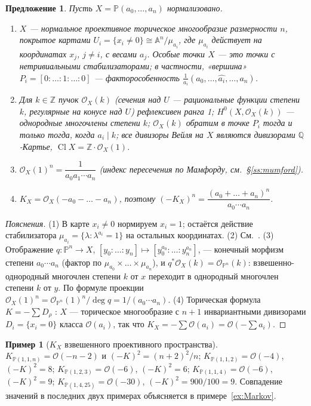 \documentclass[11pt,a4paper]{article}
\theoremstyle{plain}
\newtheorem{proposition}[theorem]{Предложение}
\theoremstyle{definition}
\newtheorem{example}[theorem]{Пример}
\theoremstyle{remark}
\newcommand{\Z}{\mathbb{Z}}
\newcommand{\Q}{\mathbb{Q}}
\newcommand{\PP}{\mathbb{P}}
\newcommand{\A}{\mathbb{A}}
\newcommand{\cO}{\mathcal{O}}
\DeclareMathOperator{\Cl}{Cl}
\begin{document}
\begin{proposition}\label{prop:wps}
Пусть $X=\PP(a_0,\dots,a_n)$ нормализовано.
\begin{enumerate}
\item $X$ --- нормальное проективное торическое многообразие размерности $n$, покрытое картами
$U_i=\{x_i\ne0\}\cong\A^n/\mu_{a_i}$, где $\mu_{a_i}$ действует на координатах $x_j$, $j\ne i$,
с весами $a_j$. Особые точки $X$ --- это точки с нетривиальными стабилизаторами; в частности,
«вершина» $P_i=[0:\dots:1:\dots:0]$ --- факторособенность $\frac1{a_i}(a_0,\dots,\widehat{a_i},\dots,a_n)$.
\item Для $k\in\Z$ пучок $\cO_X(k)$ \textup{(}сечения над $U$ --- рациональные функции степени $k$,
регулярные на конусе над $U$\textup{)} рефлексивен ранга 1; $H^0(X,\cO_X(k))$ --- однородные многочлены
степени $k$; $\cO_X(k)$ обратим в точке $P_i$ тогда и только тогда, когда $a_i\mid k$; все
дивизоры Вейля на $X$ являются дивизорами $\Q$-Картье, $\Cl X=\Z\cdot\cO_X(1)$.
\item $\cO_X(1)^n=\dfrac1{a_0a_1\cdots a_n}$ \textup{(}индекс пересечения по Мамфорду, см.~\S\ref{ss:mumford}\textup{)}.
\item $K_X=\cO_X(-a_0-\dots-a_n)$, поэтому $(-K_X)^n=\dfrac{(a_0+\dots+a_n)^n}{a_0\cdots a_n}$.
\end{enumerate}
\end{proposition}
\begin{proof}[Пояснения]
(1) В карте $x_i\ne0$ нормируем $x_i=1$; остаётся действие стабилизатора $\mu_{a_i}=\{\lambda:
\lambda^{a_i}=1\}$ на остальных координатах. (2) См.~\cite[\S\,1]{Dolg-WPS}. (3) Отображение
$q\colon\PP^n\to X$, $[y_0:\dots:y_n]\mapsto[y_0^{a_0}:\dots:y_n^{a_n}]$, --- конечный морфизм
степени $a_0\cdots a_n$ (фактор по $\mu_{a_0}\times\dots\times\mu_{a_n}$), и $q^*\cO_X(k)=\cO_{\PP^n}(k)$:
взвешенно-однородный многочлен степени $k$ от $x$ переходит в однородный многочлен степени $k$ от
$y$. По формуле проекции $\cO_X(1)^n=\cO_{\PP^n}(1)^n/\deg q=1/(a_0\cdots a_n)$. (4) Торическая
формула $K=-\sum D_\rho$ \cite[8.2.3]{CLS}: $X$ --- торическое многообразие с $n+1$ инвариантными
дивизорами $D_i=\{x_i=0\}$ класса $\cO(a_i)$, так что $K_X=-\sum\cO(a_i)=\cO(-\sum a_i)$.
\end{proof}

\begin{example}[$K_X$ взвешенного проективного пространства]\label{ex:K-wps}
$K_{\PP(1,1,n)}=\cO(-n-2)$ и $(-K)^2=(n+2)^2/n$; $K_{\PP(1,1,2)}=\cO(-4)$, $(-K)^2=8$;
$K_{\PP(1,2,3)}=\cO(-6)$, $(-K)^2=6$; $K_{\PP(1,1,4)}=\cO(-6)$, $(-K)^2=9$;
$K_{\PP(1,4,25)}=\cO(-30)$, $(-K)^2=900/100=9$. Совпадение значений в последних двух примерах
объясняется в примере~\ref{ex:Markov}.
\end{example}
\end{document}
